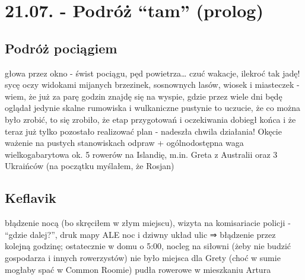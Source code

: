 \chapter{21.07. - Podróż “tam” (prolog)}


\section{Podróż pociągiem}

głowa przez okno - świst pociągu, pęd powietrza… czuć wakacje, ilekroć tak jadę!
sycę oczy widokami mijanych brzezinek, sosnownych lasów, wiosek i miasteczek - wiem, że już za parę godzin znajdę się na wyspie, gdzie przez wiele dni będę oglądał jedynie skalne rumowiska i wulkaniczne pustynie
to uczucie, że co można było zrobić, to się zrobiło, że etap przygotowań i oczekiwania dobiegł końca i że teraz już tylko pozostało realizować plan - nadeszła chwila działania!
Okęcie
ważenie na pustych stanowiskach odpraw + ogólnodostępna waga wielkogabarytowa
ok. 5 rowerów na Islandię, m.in. Greta z Australii oraz 3 Ukraińców (na początku myślałem, że Rosjan)

\section{Keflavik}

błądzenie nocą (bo skręciłem w złym miejscu), wizyta na komisariacie policji - “gdzie dalej?”, druk mapy ALE noc i dziwny układ ulic ⇒ błądzenie przez kolejną godzinę; ostatecznie w domu o 5:00, nocleg na siłowni (żeby nie budzić gospodarza i innych rowerzystów)
nie było miejsca dla Grety (choć w sumie mogłaby spać w Common Roomie)
pudła rowerowe w mieszkaniu Artura
